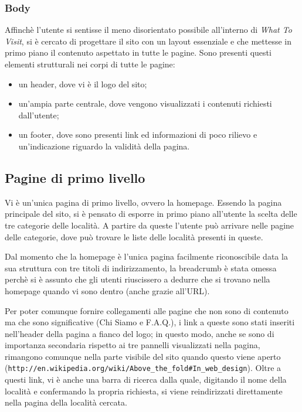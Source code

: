 \subsubsection{Body}
Affinchè l'utente si sentisse il meno disorientato possibile all'interno di \textit{What To Visit}, si è cercato di progettare il sito con un layout essenziale e che mettesse in primo piano il contenuto aspettato in tutte le pagine.
Sono presenti questi elementi strutturali nei corpi di tutte le pagine:
\begin{itemize}
\item un header, dove vi è il logo del sito;
\item un'ampia parte centrale, dove vengono visualizzati i contenuti richiesti dall'utente;
\item un footer, dove sono presenti link ed informazioni di poco rilievo e un'indicazione riguardo la validità della pagina.
\end{itemize}

\subsection{Pagine di primo livello}
Vi è un'unica pagina di primo livello, ovvero la homepage.
Essendo la pagina principale del sito, si è pensato di esporre in primo piano all'utente la scelta delle tre categorie delle località.
A partire da queste l'utente può arrivare nelle pagine delle categorie, dove può trovare le liste delle località presenti in queste.

Dal momento che la homepage è l'unica pagina facilmente riconoscibile data la sua struttura con tre titoli di indirizzamento, la breadcrumb è stata omessa perchè si è assunto che gli utenti riuscissero a dedurre che si trovano nella homepage quando vi sono dentro (anche grazie all'URL).

Per poter comunque fornire collegamenti alle pagine che non sono di contenuto ma che sono significative (Chi Siamo e F.A.Q.), i link a queste sono stati inseriti nell'header della pagina a fianco del logo; in questo modo, anche se sono di importanza secondaria rispetto ai tre pannelli visualizzati nella pagina, rimangono comunque nella parte visibile del sito quando questo viene aperto (\texttt{http://en.wikipedia.org/wiki/Above\_the\_fold\#In\_web\_design}). Oltre a questi link, vi è anche una barra di ricerca dalla quale, digitando il nome della località e confermando la propria richiesta, si viene reindirizzati direttamente nella pagina della località cercata.

